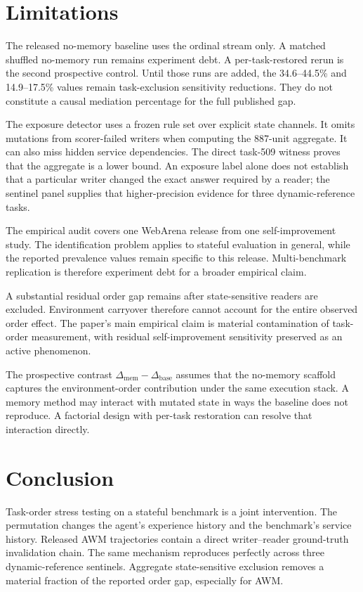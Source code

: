 \section{Limitations}
The released no-memory baseline uses the ordinal stream only. A matched shuffled no-memory run remains experiment debt. A per-task-restored rerun is the second prospective control. Until those runs are added, the 34.6--44.5\% and 14.9--17.5\% values remain task-exclusion sensitivity reductions. They do not constitute a causal mediation percentage for the full published gap.

The exposure detector uses a frozen rule set over explicit state channels. It omits mutations from scorer-failed writers when computing the 887-unit aggregate. It can also miss hidden service dependencies. The direct task-509 witness proves that the aggregate is a lower bound. An exposure label alone does not establish that a particular writer changed the exact answer required by a reader; the sentinel panel supplies that higher-precision evidence for three dynamic-reference tasks.

The empirical audit covers one WebArena release from one self-improvement study. The identification problem applies to stateful evaluation in general, while the reported prevalence values remain specific to this release. Multi-benchmark replication is therefore experiment debt for a broader empirical claim.

A substantial residual order gap remains after state-sensitive readers are excluded. Environment carryover therefore cannot account for the entire observed order effect. The paper's main empirical claim is material contamination of task-order measurement, with residual self-improvement sensitivity preserved as an active phenomenon.

The prospective contrast $\Delta_{\mathrm{mem}}-\Delta_{\mathrm{base}}$ assumes that the no-memory scaffold captures the environment-order contribution under the same execution stack. A memory method may interact with mutated state in ways the baseline does not reproduce. A factorial design with per-task restoration can resolve that interaction directly.

\section{Conclusion}
Task-order stress testing on a stateful benchmark is a joint intervention. The permutation changes the agent's experience history and the benchmark's service history. Released AWM trajectories contain a direct writer--reader ground-truth invalidation chain. The same mechanism reproduces perfectly across three dynamic-reference sentinels. Aggregate state-sensitive exclusion removes a material fraction of the reported order gap, especially for AWM.

